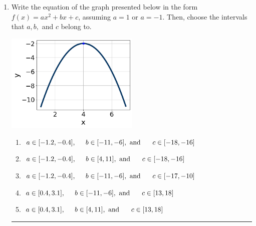 \documentclass[14pt]{extbook}
\newcommand{\litem}[1]{\item#1\hspace*{-1cm}\rule{\textwidth}{0.4pt}}
\begin{document}
\begin{enumerate}
{\begin{enumerate}[label=\Alph*.]
\end{enumerate} }
\litem{
Write the equation of the graph presented below in the form $f(x)=ax^2+bx+c$, assuming  $a=1$ or $a=-1$. Then, choose the intervals that $a, b,$ and $c$ belong to.
\begin{center}
    \includegraphics[width=0.5\textwidth]{../Figures/quadraticGraphToEquationB.png}
\end{center}
\begin{enumerate}[label=\Alph*.]
\item \( a \in [-1.2, -0.4], \hspace*{5mm} b \in [-11, -6], \text{ and } \hspace*{5mm} c \in [-18, -16] \)
\item \( a \in [-1.2, -0.4], \hspace*{5mm} b \in [4, 11], \text{ and } \hspace*{5mm} c \in [-18, -16] \)
\item \( a \in [-1.2, -0.4], \hspace*{5mm} b \in [-11, -6], \text{ and } \hspace*{5mm} c \in [-17, -10] \)
\item \( a \in [0.4, 3.1], \hspace*{5mm} b \in [-11, -6], \text{ and } \hspace*{5mm} c \in [13, 18] \)
\item \( a \in [0.4, 3.1], \hspace*{5mm} b \in [4, 11], \text{ and } \hspace*{5mm} c \in [13, 18] \)


\end{enumerate}}
\end{enumerate}
\end{document}
